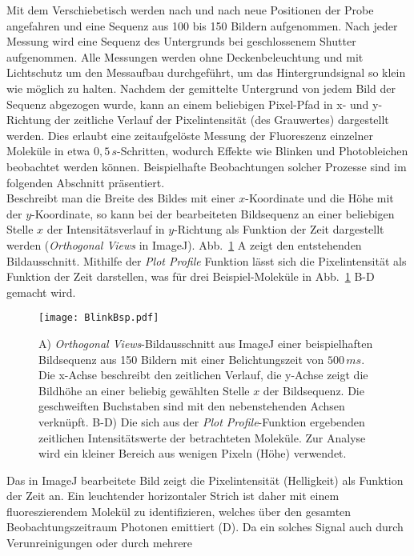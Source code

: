 Mit dem Verschiebetisch werden nach und nach neue Positionen der Probe angefahren und eine Sequenz 
aus 100 bis 150 Bildern aufgenommen. Nach jeder Messung wird eine Sequenz des Untergrunds bei geschlossenem 
Shutter aufgenommen. Alle Messungen werden ohne Deckenbeleuchtung und mit Lichtschutz um den Messaufbau 
durchgeführt, um das Hintergrundsignal so klein wie möglich zu halten. Nachdem der gemittelte Untergrund 
von jedem Bild der Sequenz abgezogen wurde, kann an einem beliebigen Pixel-Pfad in x- und y-Richtung der 
zeitliche Verlauf der Pixelintensität (des Grauwertes) dargestellt werden. 
Dies erlaubt eine zeitaufgelöste Messung der Fluoreszenz einzelner Moleküle in etwa $0,5\,\si{s}$-Schritten, 
wodurch Effekte wie Blinken und Photobleichen beobachtet werden können. 
Beispielhafte Beobachtungen solcher Prozesse sind im folgenden Abschnitt präsentiert. \\
Beschreibt man die Breite des Bildes mit einer $x$-Koordinate und die Höhe mit der $y$-Koordinate, so kann 
bei der bearbeiteten Bildsequenz an einer beliebigen Stelle $x$ der Intensitätsverlauf in $y$-Richtung
als Funktion der Zeit dargestellt werden (\textit{Orthogonal Views} in ImageJ). 
Abb.~\ref{fig:beispielBlink} A zeigt den entstehenden Bildausschnitt. Mithilfe der \textit{Plot Profile}
Funktion lässt sich die Pixelintensität als Funktion der Zeit darstellen, was für drei Beispiel-Moleküle 
in Abb.~\ref{fig:beispielBlink} B-D gemacht wird. 
\begin{figure}[h!]
    \centering
    \texttt{[image: BlinkBsp.pdf]}
    \caption{\label{fig:beispielBlink}A) \textit{Orthogonal Views}-Bildausschnitt aus ImageJ einer 
    beispielhaften Bildsequenz aus 150 Bildern mit einer Belichtungszeit von $500\,\si{ms}$. Die x-Achse beschreibt den 
    zeitlichen Verlauf, die y-Achse zeigt die Bildhöhe an einer beliebig gewählten Stelle $x$ der Bildsequenz. Die geschweiften 
    Buchstaben sind mit den nebenstehenden Achsen verknüpft. B-D) Die sich aus der \textit{Plot Profile}-Funktion ergebenden 
    zeitlichen Intensitätswerte der betrachteten Moleküle. Zur Analyse wird ein kleiner Bereich aus wenigen Pixeln (Höhe) verwendet.}
\end{figure}\FloatBarrier
Das in ImageJ bearbeitete Bild zeigt die Pixelintensität (Helligkeit) als Funktion 
der Zeit an. Ein leuchtender horizontaler Strich ist daher mit 
einem fluoreszierendem Molekül zu identifizieren, welches über den 
gesamten Beobachtungszeitraum Photonen emittiert (D). 
Da ein solches Signal auch durch Verunreinigungen oder durch mehrere 
